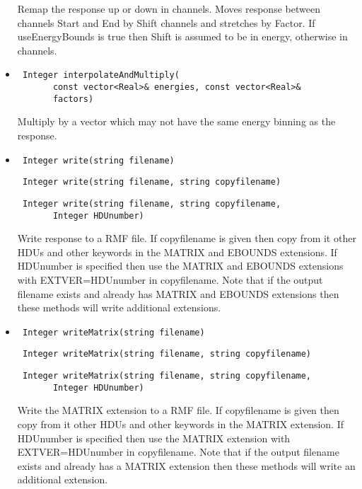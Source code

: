 \documentclass[11pt]{book}
\begin{document}
\begin{itemize}
          Remap the response up or down in channels. Moves response
          between channels Start and End by Shift channels and
          stretches by Factor. If useEnergyBounds is true then Shift
          is assumed to be in energy, otherwise in channels.

\item  \begin{verbatim} Integer interpolateAndMultiply(
       const vector<Real>& energies, const vector<Real>&
       factors) \end{verbatim}

          Multiply by a vector which may not have the same energy
          binning as the response.

\item  \begin{verbatim} Integer write(string filename) \end{verbatim}
       \begin{verbatim} Integer write(string filename, string copyfilename) \end{verbatim}
       \begin{verbatim} Integer write(string filename, string copyfilename,
       Integer HDUnumber) \end{verbatim}

          Write response to a RMF file. If copyfilename is given then
          copy from it other HDUs and other keywords in the MATRIX and
          EBOUNDS extensions. If HDUnumber is specified then use the
          MATRIX and EBOUNDS extensions with EXTVER=HDUnumber in
          copyfilename. Note that if the output filename exists and 
          already has MATRIX and EBOUNDS extensions then these methods 
          will write additional extensions.

\item  \begin{verbatim} Integer writeMatrix(string filename) \end{verbatim}
       \begin{verbatim} Integer writeMatrix(string filename, string copyfilename) \end{verbatim}
       \begin{verbatim} Integer writeMatrix(string filename, string copyfilename,
       Integer HDUnumber) \end{verbatim}

          Write the MATRIX extension to a RMF file. If copyfilename is 
          given then copy from it other HDUs and other keywords in the 
          MATRIX extension. If HDUnumber is specified then use the
          MATRIX extension with EXTVER=HDUnumber in copyfilename. Note 
          that if the output filename exists and already has a MATRIX 
          extension then these methods will write an additional extension.


\end{itemize}
\end{document}
